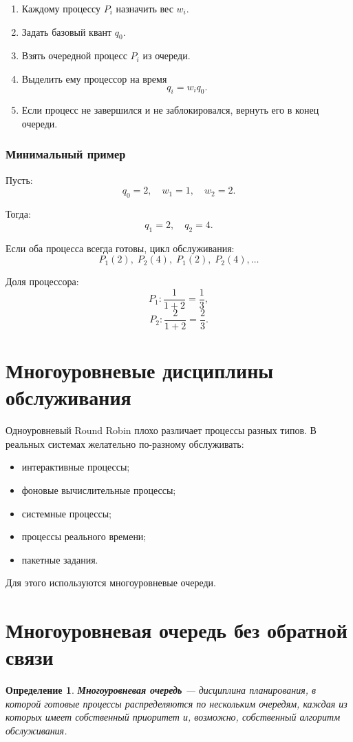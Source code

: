 \documentclass[12pt,a4paper]{article}
\newtheorem{definition}{Определение}
\begin{document}
\begin{enumerate}
    \item Каждому процессу $P_i$ назначить вес $w_i$.
    \item Задать базовый квант $q_0$.
    \item Взять очередной процесс $P_i$ из очереди.
    \item Выделить ему процессор на время
    \[
    q_i = w_i q_0.
    \]
    \item Если процесс не завершился и не заблокировался, вернуть его в конец очереди.
\end{enumerate}

\subsubsection{Минимальный пример}

Пусть:
\[
q_0 = 2,\quad w_1 = 1,\quad w_2 = 2.
\]

Тогда:
\[
q_1 = 2,\quad q_2 = 4.
\]

Если оба процесса всегда готовы, цикл обслуживания:
\[
P_1(2),\; P_2(4),\; P_1(2),\; P_2(4),\ldots
\]

Доля процессора:
\[
P_1: \frac{1}{1+2} = \frac{1}{3},
\]
\[
P_2: \frac{2}{1+2} = \frac{2}{3}.
\]

\section{Многоуровневые дисциплины обслуживания}

Одноуровневый Round Robin плохо различает процессы разных типов. В реальных системах желательно по-разному обслуживать:
\begin{itemize}
    \item интерактивные процессы;
    \item фоновые вычислительные процессы;
    \item системные процессы;
    \item процессы реального времени;
    \item пакетные задания.
\end{itemize}

Для этого используются многоуровневые очереди.

\section{Многоуровневая очередь без обратной связи}

\begin{definition}
\textbf{Многоуровневая очередь} --- дисциплина планирования, в которой готовые процессы распределяются по нескольким очередям, каждая из которых имеет собственный приоритет и, возможно, собственный алгоритм обслуживания.
\end{definition}
\end{document}
